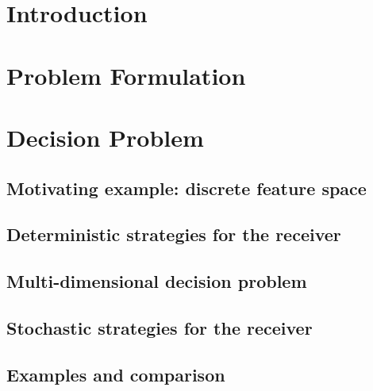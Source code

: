 \documentclass[journal, 12pt, onecolumn]{IEEEtran}
\theoremstyle{plain}
\theoremstyle{definition}
\begin{document}
	\section{Introduction}\label{sec:Introduction}

	

	\section{Problem Formulation}\label{sec:Problem formulation}

	

	\section{Decision Problem}\label{sec:Decision problem}

	

	\subsection{Motivating example: discrete feature space}\label{subsec:Discrete feature space}

	

	\subsection{Deterministic strategies for the receiver}\label{subsec:Deterministic strategy}

	

        \subsection{Multi-dimensional decision problem}

        
        
	\subsection{Stochastic strategies for the receiver}\label{subsec: Stochastic strategy}

	

	\subsection{Examples and comparison}\label{subsec:Examples and comparision}
\end{document}

